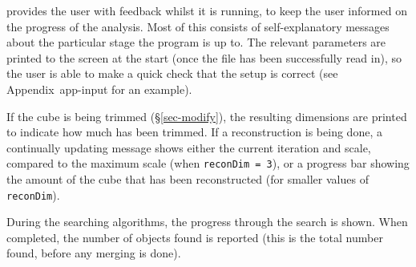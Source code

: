 %
%
%
%
\label{sec-output}


\duchamp provides the user with feedback whilst it is running, to
keep the user informed on the progress of the analysis. Most of this
consists of self-explanatory messages about the particular stage the
program is up to. The relevant parameters are printed to the screen at
the start (once the file has been successfully read in), so the user
is able to make a quick check that the setup is correct (see
Appendix~{app-input} for an example).

If the cube is being trimmed (\S\ref{sec-modify}), the resulting
dimensions are printed to indicate how much has been trimmed. If a
reconstruction is being done, a continually updating message shows
either the current iteration and scale, compared to the maximum scale
(when \texttt{reconDim = 3}), or a progress bar showing the amount of
the cube that has been reconstructed (for smaller values of
\texttt{reconDim}).

During the searching algorithms, the progress through the search is
shown. When completed, the number of objects found is reported (this
is the total number found, before any merging is done).

